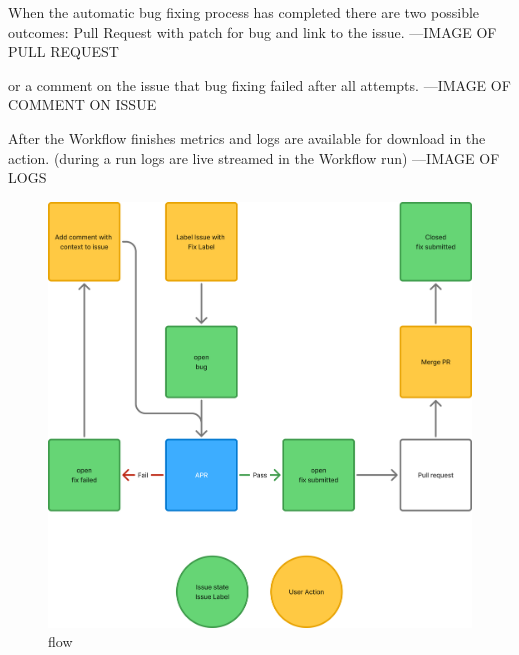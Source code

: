 When the automatic bug fixing process has completed there are two possible outcomes:
Pull Request with patch for bug and link to the issue.
---IMAGE OF PULL REQUEST

or a comment on the issue that bug fixing failed after all attempts.
---IMAGE OF COMMENT ON ISSUE

After the Workflow finishes metrics and logs are available for download in the action.
(during a run logs are live streamed in the Workflow run)
---IMAGE OF LOGS


\begin{figure}[H]
    \centering
    \includegraphics[width=1\textwidth]{images/flowcharts/flow.png}
    \caption{flow}
    \label{fig:flow}
\end{figure}


